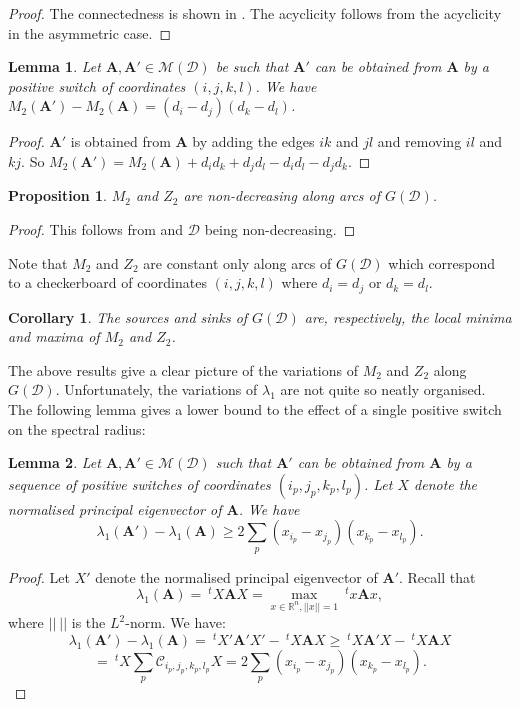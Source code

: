 \documentclass{article}
\newtheorem{lemma}{Lemma}
\newtheorem{prop}{Proposition}
\newtheorem{corollary}{Corollary}
\newcommand{\R}{\mathbb{R}}
\newcommand{\D}{\mathcal D}
\newcommand{\MM}{\mathcal M}
\renewcommand{\ll}{\lambda_1}
\newcommand{\CC}{\mathcal C}
\newcommand{\A}{\mathbf A}
\begin{document}
\begin{proof}
The connectedness is shown in \cite{berge1970graphes}. The acyclicity follows from the acyclicity in the asymmetric case. 
\end{proof}

\begin{lemma}\label{M2 switch}
Let $\A,\A'\in\MM(\D)$ be such that $\A'$ can be obtained from $\A$ by a positive switch of coordinates $(i,j,k,l)$. We have $M_2(\A')-M_2(\A)=(d_i-d_j)(d_k-d_l)$.
\end{lemma}

\begin{proof}
$\A'$ is obtained from $\A$ by adding the edges $ik$ and $jl$ and removing $il$ and $kj$. So $M_2(\A')= M_2(\A)+d_id_k+d_jd_l-d_id_l-d_jd_k$.
\end{proof}


\begin{prop}
$M_2$ and $Z_2$ are non-decreasing along arcs of $G(\D)$.
\end{prop}

\begin{proof}
This follows from  and $\D$ being non-decreasing.
\end{proof}

Note that $M_2$ and $Z_2$ are constant only along arcs of $G(\D)$ which correspond to a checkerboard of coordinates $(i,j,k,l)$ where $d_i=d_j$ or $d_k=d_l$. 

\begin{corollary}
The sources and sinks of $G(\D)$ are, respectively, the local minima and maxima of $M_2$ and $Z_2$. 
\end{corollary}

The above results give a clear picture of the variations of $M_2$ and $Z_2$ along $G(\D)$. Unfortunately, the variations of $\ll$ are not quite so neatly organised. The following lemma gives a lower bound to the effect of a single positive switch on the spectral radius:

\begin{lemma}\label{lambda1 switch}
Let $\A,\A'\in\MM(\D)$ such that $\A'$ can be obtained from $\A$ by a sequence of positive switches of coordinates $(i_p,j_p,k_p,l_p)$. Let $X$ denote the normalised principal eigenvector of $\A$. We have $$\ll(\A')-\ll(\A)\geq 2\sum_p (x_{i_p}-x_{j_p})(x_{k_p}-x_{l_p}).$$
\end{lemma}

\begin{proof}
Let $X'$ denote the normalised principal eigenvector of $\A'$. Recall that $$\ll(\A)=~^tX\A X=\max_{x\in \R^n,||x||=1}~^tx\A x,$$
where $||~||$ is the $L^2$-norm. We have:
$$\ll(\A')-\ll(\A)=~^tX'\A'X'-~^tX\A X \geq  ~^tX\A'X-~^tX\A X$$
$$=~^tX\sum_p\CC_{i_p,j_p,k_p,l_p}X=2\sum_p (x_{i_p}-x_{j_p})(x_{k_p}-x_{l_p}).$$
\end{proof}
\end{document}
